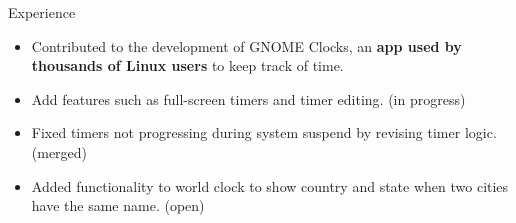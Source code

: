 \documentclass{resume} %
\begin{document}
\begin{workSection}{Experience}
	\experienceItem[
	company=GNOME Foundation,
	location=Remote,
	position=Open-Source Contributor,
	duration=December 2023 {-} present
	]
	\begin{itemize}
		\vspace{-0.5em}
		\itemsep -6pt {}
		\item Contributed to the development of GNOME Clocks, an \textbf{app used by thousands of Linux users} to keep track of time.
		\item Add features such as full-screen timers and timer editing. (in progress)
		\item Fixed timers not progressing during system suspend by revising timer logic. (merged)
		\item Added functionality to world clock to show country and state when two cities have the same name. (open)
	\end{itemize}


\end{workSection}
\end{document}
